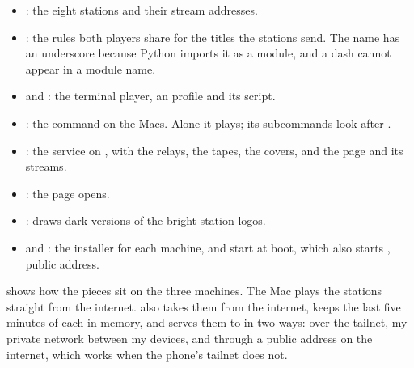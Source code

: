\documentclass[11pt,a4paper]{article}
\begin{document}
\begin{itemize}[nosep]
  \item \textbf{}: the eight stations and their stream addresses.
  \item \textbf{}: the rules both players share for the titles the stations send.  The name has an underscore because Python imports it as a module, and a dash cannot appear in a module name.
  \item \textbf{} and \textbf{}: the terminal player, an  profile and its script.
  \item \textbf{}: the command on the Macs. Alone it plays; its subcommands look after .
  \item \textbf{}: the service on , with the relays, the tapes, the covers, and the page and its streams.
  \item \textbf{}: the page  opens.
  \item \textbf{}: draws dark versions of the bright station logos.
  \item \textbf{} and \textbf{}: the installer for each machine, and  start at boot, which also starts  ,  public address.
\end{itemize}

 shows how the pieces sit on the three machines. The Mac plays the stations straight from the internet.  also takes them from the internet, keeps the last five minutes of each in memory, and serves them to  in two ways: over the tailnet, my private network between my devices, and through a public address on the internet, which works when the phone's tailnet does not.
\end{document}
